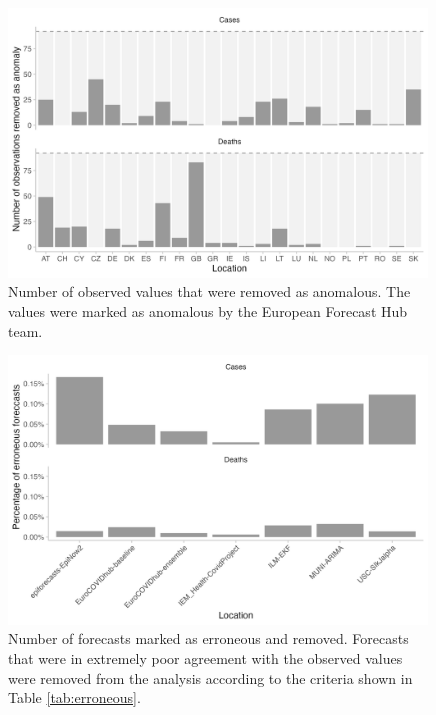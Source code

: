 \documentclass{article}
\begin{document}
\begin{figure}[h!]
    \centering
    \includegraphics[width=0.99\textwidth]{output/figures/number-anomalies.png}
    \caption{
    Number of observed values that were removed as anomalous. The values were marked as anomalous by the European Forecast Hub team. 
    }
    \label{fig:number-anomalies}
\end{figure}

\begin{figure}[h!]
    \centering
    \includegraphics[width=0.99\textwidth]{output/figures/erroneous-forecasts.png}
    \caption{
    Number of forecasts marked as erroneous and removed. Forecasts that were in extremely poor agreement with the observed values were removed from the analysis according to the criteria shown in Table \ref{tab:erroneous}. 
    }
    \label{fig:erroneous-forecasts}
\end{figure}
\end{document}
